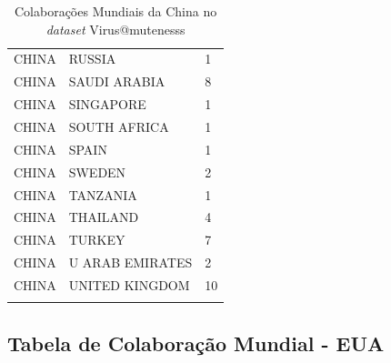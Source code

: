 \begin{longtable}{@{}|l|l|l|@{}}
CHINA & RUSSIA          & 1         \\
CHINA & SAUDI ARABIA    & 8         \\
CHINA & SINGAPORE       & 1         \\
CHINA & SOUTH AFRICA    & 1         \\
CHINA & SPAIN           & 1         \\
CHINA & SWEDEN          & 2         \\
CHINA & TANZANIA        & 1         \\
CHINA & THAILAND        & 4         \\
CHINA & TURKEY          & 7         \\
CHINA & U ARAB EMIRATES & 2         \\
CHINA & UNITED KINGDOM  & 10        \\* \bottomrule
\caption{Colaborações Mundiais da China no \textit{dataset} Virus@mutenesss}
\label{tab:ChinaWorldColab:Virus@mutenesss}
\end{longtable}


\subsection{Tabela de Colaboração Mundial - EUA}

